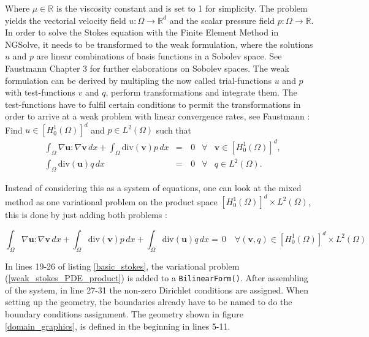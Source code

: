 \null

Where $\mu \in \mathbb{R}$ is the viscosity constant and is set to 1 for simplicity. 
The problem yields the vectorial velocity field $u:\Omega \rightarrow \mathbb{R}^d$ and 
the scalar pressure field $p:\Omega \rightarrow \mathbb{R}$. In order to solve the Stokes equation with the Finite Element Method in NGSolve,
it needs to be transformed to the weak formulation, where the solutions $u$ and $p$ are linear combinations of basis functions in a Sobolev space.
See Faustmann\cite{lecture_notes_faustmann_numPDE} Chapter 3 for further elaborations on Sobolev spaces. The weak formulation can be derived by
multipling the now called trial-functions $u$ and $p$ with test-functions $v$ and $q$, perform transformations and integrate them. The test-functions have to fulfil certain
conditions to permit the transformations in order to arrive at a weak problem with 
linear convergence rates, see Faustmann \cite{lecture_notes_faustmann_numPDE}: \\

Find $u \in [H^1_0(\Omega)]^d$ and $p \in L^2(\Omega)$ such that
\begin{equation}\label{weak_stokes_PDE}
    \begin{aligned}
    &\int_{\Omega} \nabla \mathbf{u} : \nabla \mathbf{v} \, dx + \int_{\Omega} \mathrm{div}(\mathbf{v})p \, dx &=& \, 0 &\forall& \mathbf{v} \in [H^1_0(\Omega)]^d, \\
    &\int_{\Omega} \mathrm{div}(\mathbf{u})q \, dx &=& \, 0   &\forall& q \in L^2(\Omega).
    \end{aligned}
\end{equation}

\null

Instead of considering this as a system of equations, one can look at the mixed method as one variational problem on
the product space $[H^1_0(\Omega)]^d \times L^2(\Omega)$, this is done by just adding both problems \cite{lecture_notes_faustmann_numPDE}:

\null

\begin{equation}\label{weak_stokes_PDE_product}
    \int_{\Omega} \nabla \mathbf{u} : \nabla \mathbf{v} \, dx + \int_{\Omega} \mathrm{div}(\mathbf{v})p \, 
    dx + \int_{\Omega} \mathrm{div}(\mathbf{u})q \, dx = \, 0 \quad \forall (\mathbf{v},q)
    \in  [H^1_0(\Omega)]^d \times L^2(\Omega)
\end{equation}

\null

In lines 19-26 of listing \ref{basic_stokes}, the variational problem (\ref{weak_stokes_PDE_product}) is added to
a \texttt{BilinearForm()}. After assembling of the system, in line 27-31 the non-zero Dirichlet conditions are assigned. 
When setting up the geometry, the boundaries already have to be named to do the boundary conditions assignment. The geometry
shown in figure \ref{domain_graphics}, is defined in the beginning in lines 5-11.


